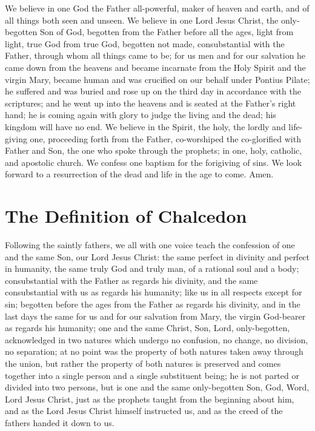 \documentclass[14pt,openany]{book}
\begin{document}
			We believe in one God the Father all-powerful, maker of heaven and earth, and of all things both seen and unseen. We believe in one Lord Jesus Christ, the only-begotten Son of God, begotten from the Father before all the ages, light from light, true God from true God, begotten not made, consubstantial with the Father, through whom all things came to be; for us men and for our salvation he came down from the heavens and became incarnate from the Holy Spirit and the virgin Mary, became human and was crucified on our behalf under Pontius Pilate; he suffered and was buried and rose up on the third day in accordance with the scriptures; and he went up into the heavens and is seated at the Father's right hand; he is coming again with glory to judge the living and the dead; his kingdom will have no end. We believe in the Spirit, the holy, the lordly and life-giving one, proceeding forth from the Father, co-worshiped the co-glorified with Father and Son, the one who spoke through the prophets; in one, holy, catholic, and apostolic church. We confess one baptism for the forigiving of sins. We look forward to a resurrection of the dead and life in the age to come. Amen.
			
		\section{The Definition of Chalcedon}
		
			Following the saintly fathers, we all with one voice teach the confession of one and the same Son, our Lord Jesus Christ: the same perfect in divinity and perfect in humanity, the same truly God and truly man, of a rational soul and a body; consubstantial with the Father as regards his divinity, and the same consubstantial with us as regards his humanity; like us in all respects except for sin; begotten before the ages from the Father as regards his divinity, and in the last days the same for us and for our salvation from Mary, the virgin God-bearer as regards his humanity; one and the same Christ, Son, Lord, only-begotten, acknowledged in two natures which undergo no confusion, no change, no division, no separation; at no point was the property of both natures taken away through the union, but rather the property of both natures is preserved and comes together into a single person and a single substituent being; he is not parted or divided into two persons, but is one and the same only-begotten Son, God, Word, Lord Jesus Christ, just as the prophets taught from the beginning about him, and as the Lord Jesus Christ himself instructed us, and as the creed of the fathers handed it down to us.
			
\end{document}
